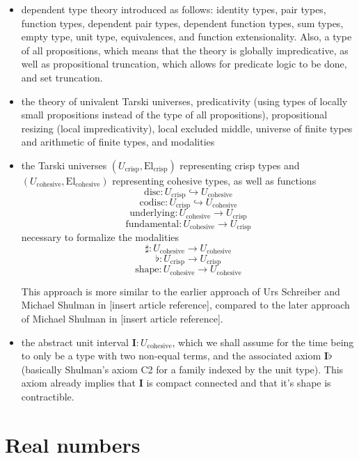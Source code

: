 \documentclass[one]{article}
\begin{document}
\begin{itemize}
\item dependent type theory introduced as follows: identity types, pair types, function types, dependent pair types, dependent function types, sum types, empty type, unit type, equivalences, and function extensionality. Also, a type of all propositions, which means that the theory is globally impredicative, as well as propositional truncation, which allows for predicate logic to be done, and set truncation. 

\item the theory of univalent Tarski universes, predicativity (using types of locally small propositions instead of the type of all propositions), propositional resizing (local impredicativity), local excluded middle, universe of finite types and arithmetic of finite types, and modalities

\item the Tarski universes $(U_\mathrm{crisp}, \mathrm{El}_\mathrm{crisp})$ representing crisp types and $(U_\mathrm{cohesive}, \mathrm{El}_\mathrm{cohesive})$ representing cohesive types, as well as functions 
$$\mathrm{disc}:U_\mathrm{crisp} \hookrightarrow U_\mathrm{cohesive}$$ 
$$\mathrm{codisc}:U_\mathrm{crisp} \hookrightarrow U_\mathrm{cohesive}$$
$$\mathrm{underlying}:U_\mathrm{cohesive} \to U_\mathrm{crisp}$$ 
$$\mathrm{fundamental}:U_\mathrm{cohesive} \to U_\mathrm{crisp}$$ 
necessary to formalize the modalities 
$$\sharp:U_\mathrm{cohesive} \to U_\mathrm{cohesive}$$
$$\flat:U_\mathrm{crisp} \to U_\mathrm{crisp}$$
$$\mathrm{shape}:U_\mathrm{cohesive} \to U_\mathrm{cohesive}$$

This approach is more similar to the earlier approach of Urs Schreiber and Michael Shulman in [insert article reference], compared to the later approach of Michael Shulman in [insert article reference]. 

\item the abstract unit interval $\mathbf{I}:U_\mathrm{cohesive}$, which we shall assume for the time being to only be a type with two non-equal terms, and the associated axiom $\mathbf{I} \flat$ (basically Shulman's axiom C2 for a family indexed by the unit type). This axiom already implies that $\mathbf{I}$ is compact connected and that it's shape is contractible. 

\end{itemize}

\section{Real numbers}
\end{document}
